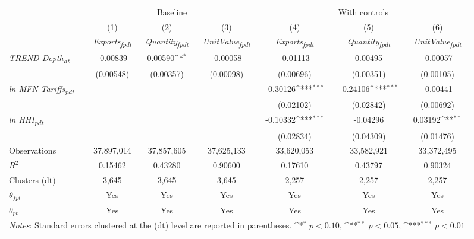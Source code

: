 {
\def\sym#1{\ifmmode^{#1}\else\(^{#1}\)\fi}
\begin{tabular}{l*{6}{c}}
\toprule
&\multicolumn{3}{c}{Baseline}&\multicolumn{3}{c}{With controls}\\\cmidrule(lr){2-4}\cmidrule(lr){5-7}
&(1)&(2)&(3)&(4)&(5)&(6)\\
&\textit{Exports\textsubscript{fpdt}}&\textit{Quantity\textsubscript{fpdt}}&\textit{UnitValue\textsubscript{fpdt}}&\textit{Exports\textsubscript{fpdt}}&\textit{Quantity\textsubscript{fpdt}}&\textit{UnitValue\textsubscript{fpdt}}\\
\midrule
\textit{TREND Depth\textsubscript{dt}} & -0.00839 & 0.00590\sym{*} & -0.00058 & -0.01113 & 0.00495 & -0.00057\\
 & (0.00548) & (0.00357) & (0.00098) & (0.00696) & (0.00351) & (0.00105)\\
\addlinespace
\textit{ln MFN Tariffs\textsubscript{pdt}} &  &  &  & -0.30126\sym{***} & -0.24106\sym{***} & -0.00441\\
 &  &  &  & (0.02102) & (0.02842) & (0.00692)\\
\addlinespace
\textit{ln HHI\textsubscript{pdt}} &  &  &  & -0.10332\sym{***} & -0.04296 & 0.03192\sym{**}\\
 &  &  &  & (0.02834) & (0.04309) & (0.01476)\\
\midrule
Observations & 37,897,014 & 37,857,605 & 37,625,133 & 33,620,053 & 33,582,921 & 33,372,495\\
$R^{2}$ & 0.15462 & 0.43280 & 0.90600 & 0.17610 & 0.43797 & 0.90324\\
Clusters (dt) & 3,645 & 3,645 & 3,645 & 2,257 & 2,257 & 2,257\\
$\theta_{fpt}$ & Yes & Yes & Yes & Yes & Yes & Yes\\
$\theta_{pt}$ & Yes & Yes & Yes & Yes & Yes & Yes\\
\bottomrule
\multicolumn{7}{l}{\footnotesize \textit{Notes}: Standard errors clustered at the (dt) level are reported in parentheses. \sym{*} \(p<0.10\), \sym{**} \(p<0.05\), \sym{***} \(p<0.01\)}\\
\end{tabular}
}
